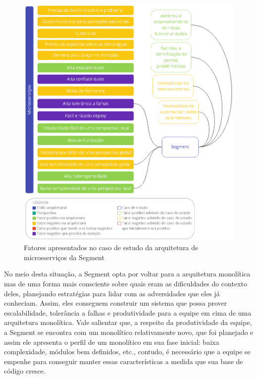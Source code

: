 \begin{figure}[h]
  \centering
  \includegraphics[keepaspectratio=true,scale=1]{figuras/analise-micro-segment.eps}
  \caption{Fatores apresentados no caso de estudo da arquitetura de microsserviços da Segment\label{fig:analise-micro-segment}}
\end{figure}

No meio desta situação, a Segment opta por voltar para a arquitetura monolítica mas de uma forma
mais consciente sobre quais eram as dificuldades do contexto deles, planejando estratégias para
lidar com as adversidades que eles já conheciam. Assim, eles conseguem construir um sistema que
possa prover escalabilidade, tolerância a falhas e produtividade para a equipe em cima de uma
arquitetura monolítica. Vale salientar que, a respeito da produtividade da equipe, a Segment se
encontra com um monolítico relativamente novo, que foi planejado e assim ele apresenta o perfil de
um monolítico em sua fase inicial: baixa complexidade, módulos bem definidos, etc., contudo, é
necessário que a equipe se empenhe para conseguir manter essas características a medida que sua base
de código cresce.


